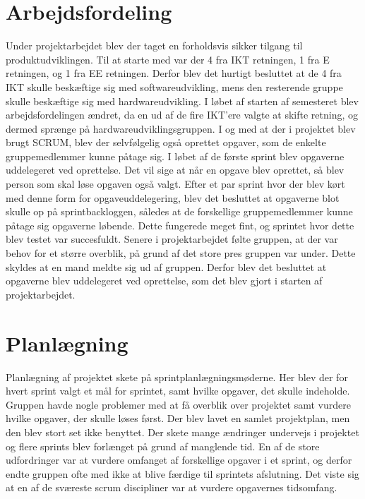 \section{Arbejdsfordeling}
Under projektarbejdet blev der taget en forholdsvis sikker tilgang til produktudviklingen. Til at starte med var der 4 fra IKT retningen, 1 fra E retningen, og 1 fra EE retningen. Derfor blev det hurtigt besluttet at de 4 fra IKT skulle beskæftige sig med softwareudvikling, mens den resterende gruppe skulle beskæftige sig med hardwareudvikling. I løbet af starten af semesteret blev arbejdsfordelingen ændret, da en ud af de fire IKT’ere valgte at skifte retning, og dermed sprænge på hardwareudviklingsgruppen. I og med at der i projektet blev brugt SCRUM, blev der selvfølgelig også oprettet opgaver, som de enkelte gruppemedlemmer kunne påtage sig. I løbet af de første sprint blev opgaverne uddelegeret ved oprettelse. Det vil sige at når en opgave blev oprettet, så blev person som skal løse opgaven også valgt. Efter et par 
sprint hvor der blev kørt med denne form for opgaveuddelegering, blev det besluttet at opgaverne blot skulle op på sprintbackloggen, således at de forskellige gruppemedlemmer kunne påtage sig opgaverne løbende. Dette fungerede meget fint, og sprintet hvor dette blev testet var succesfuldt. Senere i projektarbejdet følte gruppen, at der var behov for et større overblik, på grund af det store pres gruppen var under. Dette skyldes at en mand meldte sig ud af gruppen. Derfor blev det besluttet at opgaverne blev uddelegeret ved oprettelse, som det blev gjort i starten af projektarbejdet.


\section{Planlægning}
Planlægning af projektet skete på sprintplanlægningsmøderne. Her blev der for hvert sprint valgt et mål for sprintet, samt hvilke opgaver, det skulle indeholde. Gruppen havde nogle problemer med at få overblik over projektet samt vurdere hvilke opgaver, der skulle løses først. Der blev lavet en samlet projektplan, men den blev stort set ikke benyttet.
Der skete mange ændringer undervejs i projektet og flere sprints blev forlænget på grund af manglende tid. En af de store udfordringer var at vurdere omfanget af forskellige opgaver i et sprint, og derfor endte gruppen ofte med ikke at blive færdige til sprintets afslutning. Det viste sig at en af de sværeste scrum discipliner var at vurdere opgavernes tidsomfang. 


